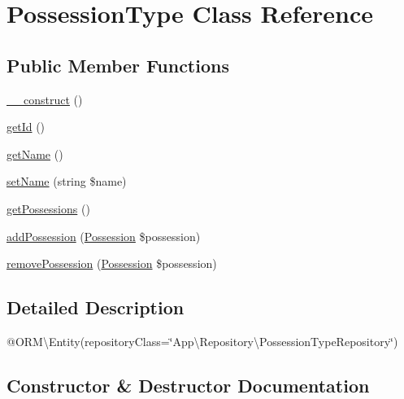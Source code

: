 \hypertarget{class_app_1_1_entity_1_1_possession_type}{}\section{Possession\+Type Class Reference}
\label{class_app_1_1_entity_1_1_possession_type}
\subsection*{Public Member Functions}
\begin{DoxyCompactItemize}
\item 
\mbox{\hyperlink{class_app_1_1_entity_1_1_possession_type_a095c5d389db211932136b53f25f39685}{\+\_\+\+\_\+construct}} ()
\item 
\mbox{\hyperlink{class_app_1_1_entity_1_1_possession_type_a12251d0c022e9e21c137a105ff683f13}{get\+Id}} ()
\item 
\mbox{\hyperlink{class_app_1_1_entity_1_1_possession_type_a3d0963e68bb313b163a73f2803c64600}{get\+Name}} ()
\item 
\mbox{\hyperlink{class_app_1_1_entity_1_1_possession_type_a392752b62c4f6aacea5c269690921ef3}{set\+Name}} (string \$name)
\item 
\mbox{\hyperlink{class_app_1_1_entity_1_1_possession_type_ac4cac51c734a24a84655cd6294ff4afb}{get\+Possessions}} ()
\item 
\mbox{\hyperlink{class_app_1_1_entity_1_1_possession_type_a5188d786a9c3e2f2936d783276947acc}{add\+Possession}} (\mbox{\hyperlink{class_app_1_1_entity_1_1_possession}{Possession}} \$possession)
\item 
\mbox{\hyperlink{class_app_1_1_entity_1_1_possession_type_a720a2c7cb1ff271659d4ca746e29ca47}{remove\+Possession}} (\mbox{\hyperlink{class_app_1_1_entity_1_1_possession}{Possession}} \$possession)
\end{DoxyCompactItemize}


\subsection{Detailed Description}
@\+O\+RM\textbackslash{}\+Entity(repository\+Class=\char`\"{}\+App\textbackslash{}\+Repository\textbackslash{}\+Possession\+Type\+Repository\char`\"{}) 

\subsection{Constructor \& Destructor Documentation}
\mbox{\label{class_app_1_1_entity_1_1_possession_type_a095c5d389db211932136b53f25f39685}} 
